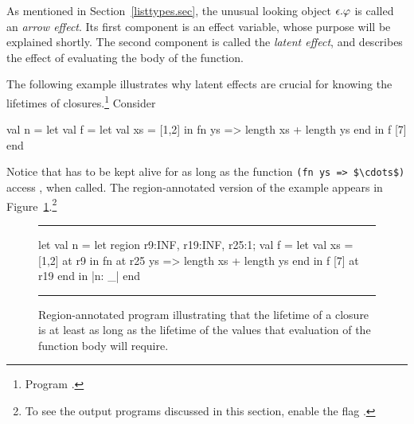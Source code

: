 \documentclass[12pt]{book}
\begin{document}
As mentioned in Section~\ref{listtypes.sec}, the unusual looking object
$\epsilon.\varphi$ is called an
%
%
%
{\em arrow effect}. Its first component
is an
%
%
%
effect variable, whose purpose will be explained shortly.  The second component
is called the
%
%
%
{\em latent effect}, and describes the effect of evaluating the body of the
function.

The following example illustrates why latent effects are crucial for knowing the
lifetimes of closures.\footnote{Program .} Consider
\begin{smlcode}
  val n = let val f = let val xs = [1,2]
                      in fn ys => length xs + length ys
                      end
          in f [7]
          end
\end{smlcode}
Notice that  has to be kept alive for as long as the function
%
\lstinline!(fn ys => $\cdots$)!%
access , when called.  The region-annotated version of the example
appears in Figure~\ref{lambda1.fig}.\footnote{To see the output programs
discussed in this section, enable the flag
.}

\begin{figure}
\hrule \medskip
\begin{smlcode}
   let val n =
         let region r9:INF, r19:INF, r25:1;
             val f =
               let val xs = [1,2] at r9
               in  fn at r25 ys => length xs + length ys
               end
         in  f [7] at r19
         end
   in  {|n: _|}
   end
\end{smlcode}
\caption{Region-annotated program illustrating that the lifetime of a closure is
  at least as long as the lifetime of the values that evaluation of the function
  body will require.}  \medskip \hrule
\label{lambda1.fig}
\end{figure}
\end{document}
